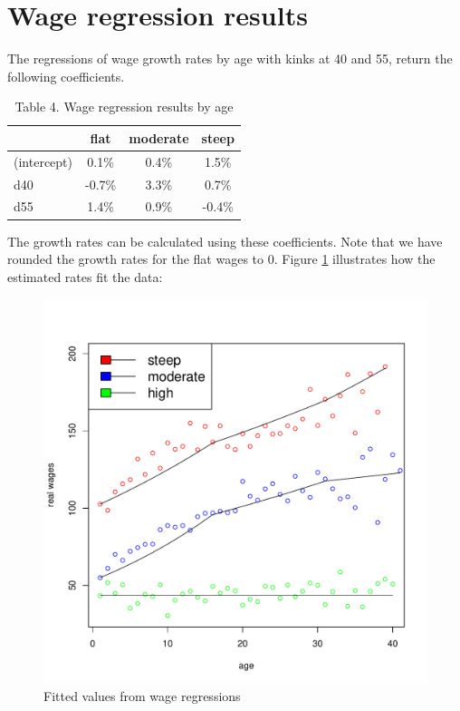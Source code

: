 \section{Wage regression results}
\label{paramcalibt}

The regressions of wage growth rates by age with kinks at 40 and 55, return the following coefficients.

\begin{table}[H]
	\centering
	\caption*{Table 4. Wage regression results by age}
	\begin{tabular}[c]{lccc}
		\hline
		&flat&moderate&steep\\
		\hline
		(intercept)&0.1\%&0.4\%&1.5\%\\
		d40&-0.7\%&3.3\%&0.7\%\\
		d55&1.4\%&0.9\%&-0.4\%\\
		\hline
	\end{tabular}
\end{table}

The growth rates can be calculated using these coefficients. Note that we have rounded the growth rates for the flat wages to $0$. Figure \ref{fig:heterwage} illustrates how the estimated rates fit the data:

\begin{figure}[h!]
	\centering
	\includegraphics[scale=0.3]{figs/heterwage.pdf}
	\caption*{Fitted values from wage regressions}
	\label{fig:heterwage}
\end{figure}


